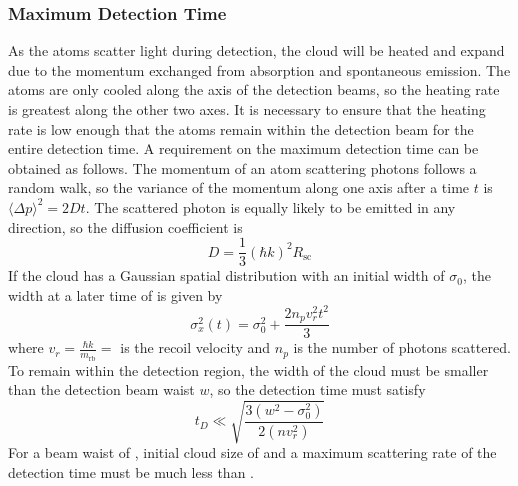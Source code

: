 \subsubsection{Maximum Detection Time}\label{subsubsec:intensity_dependendce}
As the atoms scatter light during detection, the cloud will be heated
and expand due to the momentum exchanged from absorption and
spontaneous emission. The atoms are only cooled along the axis of the
detection beams, so the heating rate is greatest along the other two
axes. It is necessary to ensure that the
heating rate is low enough that the atoms remain within the
detection beam for the entire detection time. A requirement on the
maximum detection time can be obtained as follows. The momentum of
an atom scattering photons follows a random walk, so the variance of
the momentum along one axis after a time \(t\) is
\(\langle\Delta p\rangle^2 = 2 D t\). The scattered photon is equally
likely to be emitted in any direction, so the diffusion coefficient is
\begin{equation}
  D = \frac{1}{3}(\hbar k)^2 R_\text{sc}
  \label{eq:diffusion_coeff}
\end{equation}
If the cloud has a
Gaussian spatial distribution with an
initial width of \(\sigma_0\), the width at a later time of
is given by
\begin{equation}
\sigma_x^2(t) = \sigma_0^2 + \frac{2 n_p v_r^2 t^2}{3} 
  \label{eq:width_scattering}
\end{equation}
where \(v_r = \frac{\hbar k}{m_\text{rb}} =
\)  is the recoil velocity and \(n_p\) is the
number of photons scattered. To remain within the detection region,
the width of the cloud must be smaller than the detection beam waist
\(w\), so the detection time must satisfy
\begin{equation}
  t_D \ll \sqrt{\frac{3 \left(w^2-\sigma_0^2\right)}{2 \left(n
  v_r^2\right)}}
  \label{eq:detection_time}
\end{equation}
For a beam waist of , initial cloud size of
 and a maximum scattering rate of
 the detection time must be much less than
. 
